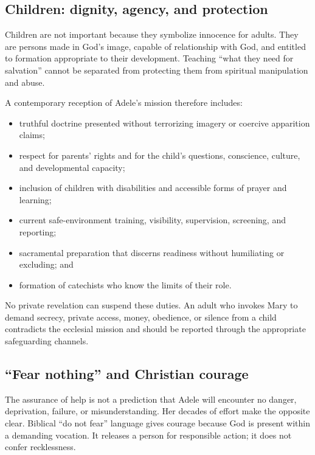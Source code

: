 \subsection{Children: dignity, agency, and protection}

Children are not important because they symbolize innocence for adults. They are persons made in God's image, capable of relationship with God, and entitled to formation appropriate to their development. Teaching “what they need for salvation” cannot be separated from protecting them from spiritual manipulation and abuse.

A contemporary reception of Adele's mission therefore includes:

\begin{itemize}
  \item truthful doctrine presented without terrorizing imagery or coercive apparition claims;
  \item respect for parents' rights and for the child's questions, conscience, culture, and developmental capacity;
  \item inclusion of children with disabilities and accessible forms of prayer and learning;
  \item current safe-environment training, visibility, supervision, screening, and reporting;
  \item sacramental preparation that discerns readiness without humiliating or excluding; and
  \item formation of catechists who know the limits of their role.
\end{itemize}

No private revelation can suspend these duties. An adult who invokes Mary to demand secrecy, private access, money, obedience, or silence from a child contradicts the ecclesial mission and should be reported through the appropriate safeguarding channels.

\subsection{“Fear nothing” and Christian courage}

The assurance of help is not a prediction that Adele will encounter no danger, deprivation, failure, or misunderstanding. Her decades of effort make the opposite clear. Biblical “do not fear” language gives courage because God is present within a demanding vocation. It releases a person for responsible action; it does not confer recklessness.

